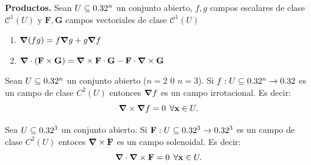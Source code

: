 \begin{propertie}\textbf{Productos.}  Sean  $U  \subseteq  0.32^n$ un conjunto abierto, $f,g$  campos escalares de clase $\mathcal{C}^1(U)$  y $\mathbf{F},\mathbf{G}$ campos vectoriales  de clase $\mathcal{C}^1(U)$
    \begin{enumerate}
        \item $\grad(fg)=f\grad g+g\grad f$
        \item $\grad\cdot(\mathbf{F}\times\mathbf{G})=\grad\times\mathbf{F}\cdot\mathbf{G}-\mathbf{F}\cdot\grad\times\mathbf{G}$
    \end{enumerate}
\end{propertie}


\begin{propertie} Sean  $U  \subseteq  0.32^n$ un conjunto abierto ($n=2$ 0 $n=3$). Si  $f:U\subseteq0.32^n\to0.32$  es un  campo de clase $C^{2}(U)$  entonces  $\grad f$ es un campo irrotacional. Es decir: $$ \grad\times  \grad f =0 \:\:  \forall  \mathbf{x} \in U.$$
\end{propertie}



\begin{propertie}
 Sea  $U  \subseteq  0.32^3$ un conjunto abierto.  Si  $\mathbf{F}:U  \subseteq  0.32^3\to0.32^3$ es un  campo de clase $C^{2}(U)$  entoces  $ \grad\times \mathbf{F}$  es un campo solenoidal. Es decir:  $$\grad\cdot   \grad\times   \mathbf{F} =0 \:\:  \forall  \mathbf{x} \in U.$$
\end{propertie}
